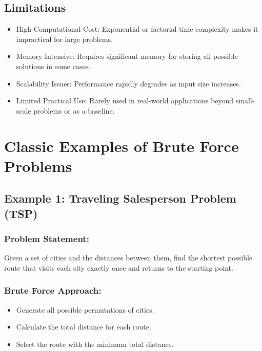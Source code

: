 \documentclass[12pt]{article}
\begin{document}
    \subsection{Limitations}
        \begin{itemize}
            \item High Computational Cost: Exponential or factorial time complexity makes it impractical for large problems.
            \item Memory Intensive: Requires significant memory for storing all possible solutions in some cases.
            \item Scalability Issues: Performance rapidly degrades as input size increases.
            \item Limited Practical Use: Rarely used in real-world applications beyond small-scale problems or as a baseline.
        \end{itemize}

    \section{Classic Examples of Brute Force Problems}

    \subsection{Example 1: Traveling Salesperson Problem (TSP)}

    \subsubsection{Problem Statement:}
    Given a set of cities and the distances between them, find the shortest possible route that visits each city exactly once and returns to the starting point.

    \subsubsection{Brute Force Approach:}
        \begin{itemize}
            \item Generate all possible permutations of cities.
            \item Calculate the total distance for each route.
            \item Select the route with the minimum total distance.
        \end{itemize}
\end{document}
